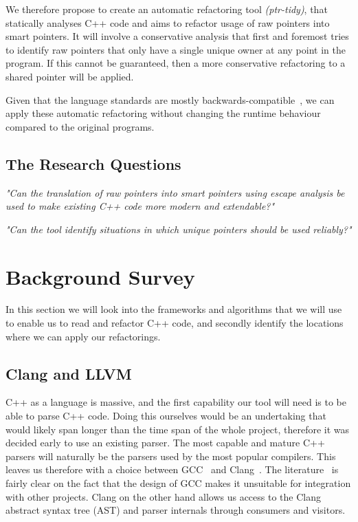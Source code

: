 \documentclass{proposal}
\begin{document}
    We therefore propose to create an automatic refactoring tool \emph{(ptr-tidy)}, that statically analyses C++ code and aims to refactor usage of raw pointers into smart pointers.
    It will involve a conservative analysis that first and foremost tries to identify raw pointers that only have a single unique owner at any point in the program.
    If this cannot be guaranteed, then a more conservative refactoring to a shared pointer will be applied.

    Given that the language standards are mostly backwards-compatible~\cite{Winters2020}, we can apply these automatic refactoring without changing the runtime behaviour compared to the original programs.


    \subsection{The Research Questions}\label{subsec:the-research-questions}

    \emph{"Can the translation of raw pointers into smart pointers using escape analysis be used to make existing C++ code more modern and extendable?"}

    \emph{"Can the tool identify situations in which unique pointers should be used reliably?"}




    \section{Background Survey}\label{sec:background-survey}

    In this section we will look into the frameworks and algorithms that we will use to enable us to read and refactor C++ code, and secondly identify the locations where we can apply our refactorings.

    \subsection{Clang and LLVM}\label{subsec:clang-and-llvm}

    C++ as a language is massive, and the first capability our tool will need is to be able to parse C++ code.
    Doing this ourselves would be an undertaking that would likely span longer than the time span of the whole project, therefore it was decided early to use an existing parser.
    The most capable and mature C++ parsers will naturally be the parsers used by the most popular compilers.
    This leaves us therefore with a choice between GCC~\cite{GCC} and Clang~\cite{Clang}.
    The literature~\cite{duffy2014} is fairly clear on the fact that the design of GCC makes it unsuitable for integration with other projects.
    Clang on the other hand allows us access to the Clang abstract syntax tree (AST) and parser internals through consumers and visitors.
\end{document}
